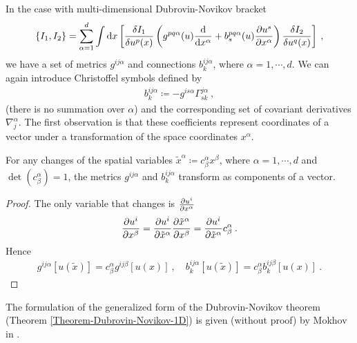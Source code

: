 In the case with multi-dimensional Dubrovin-Novikov bracket
\begin{align}
    \left \lbrace I_1,I_2 \right \rbrace = \sum_{\alpha = 1}^ d \int \mathrm{d} x 
    \left[ \frac{\delta I_1}{\delta u^p(x)} \left( g^{pq \alpha}(u) \frac{\mathrm{d}}{\mathrm{d}x^\alpha} + b^{pq\alpha}_s(u) \frac{\partial u^s}{\partial x^\alpha} \right) \frac{\delta I_2}{\delta u^q(x)} \right] \:, \label{eq:multi-dimensional bracket}
\end{align}
we have a set of metrics $g^{ij \alpha}$ and connections $b^{ij \alpha}_k$, where $\alpha = 1 , \cdots, d$. We can again introduce Christoffel symbols defined by
\begin{align}
    b^{i j \alpha}_k \coloneqq - g^{is \alpha} \Gamma^{j \alpha}_{sk}\:,
\end{align}
(there is no summation over $\alpha$) and the corresponding set of covariant derivatives $\nabla^{\alpha}_j$. The first observation is that these coefficients represent coordinates of a vector under a transformation of the space coordinates $x^\alpha$.
\begin{proposition}
    For any changes of the spatial variables $\tilde x^\alpha \coloneqq c^\alpha_\beta x^\beta$, where $\alpha = 1, \cdots, d$ and $\det (c^\alpha_\beta) = 1$, the metrics $g^{ij \alpha}$ and $b^{ij \alpha}_k$ transform as components of a vector.
\end{proposition}

\begin{proof}
    The only variable that changes is $\frac{\partial u^i}{\partial x^\alpha}$
    \begin{align}
        \frac{\partial u^i}{\partial x^\beta} = \frac{\partial u^i}{\partial \tilde x^\alpha} \frac{\partial \tilde x^\alpha}{\partial x^\beta} = \frac{\partial u^i}{\partial \tilde x^\alpha} c^\alpha_\beta \:.
    \end{align}
    Hence
    \begin{align}
        g^{ij \alpha}[u(\tilde x)] = c^\alpha_\beta g^{ij \beta}[u(x)] \:, \quad b^{ij \alpha}_k [u(\tilde x)] = c^\alpha_\beta b^{ij \beta}_k [u(x)] \:.
    \end{align}
\end{proof}


The formulation of the generalized form of the Dubrovin-Novikov theorem (Theorem \vref{Theorem-Dubrovin-Novikov-1D}) is given (without proof) by Mokhov in \cite{Mochov}.


